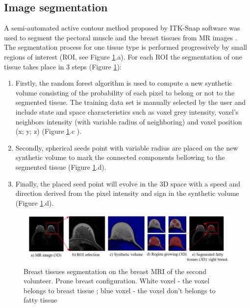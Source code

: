 \subsection{Image segmentation}%

A semi-automated active contour method proposed by ITK-Snap software was used to segment the pectoral muscle and the breast tissues from MR images \citep{yushkevich_user_2006}. The segmentation process for one tissue type is performed progressively by small regions of interest (ROI, see Figure \ref{fig:breasttissuessegmentation}.a). For each ROI the segmentation of one tissue takes place in 3 steps (Figure \ref{fig:breasttissuessegmentation}):
\begin{enumerate}
\item Firstly, the random forest algorithm \citep{ho_random_1995} is used to compute a new synthetic volume consisting of the probability of each pixel to belong or not to the segmented tissue. The training data set is manually selected by the user and include state and space characteristics such as voxel grey intensity, voxel's neighbors intensity (with variable radius of neighboring) and voxel position (x; y; z) (Figure \ref{fig:breasttissuessegmentation}.c ). 

\item Secondly, spherical seeds point with variable radius are placed on the new synthetic volume to mark the connected components bellowing to the segmented tissue (Figure \ref{fig:breasttissuessegmentation}.d).
\item Finally, the placed seed point will evolve in the 3D space with a speed and direction derived from the pixel intensity and sign in the synthetic volume (Figure \ref{fig:breasttissuessegmentation}.d).
\end{enumerate}

 
 \begin{figure}[H]
\centering
\includegraphics[width=1\textwidth,keepaspectratio]{figures/tissues_segmentation.png} 
\caption{Breast tissues segmentation on the breast MRI of the second volunteer. Prone breast configuration. White voxel - the voxel belongs to breast tissue ; blue voxel - the voxel don't belongs to fatty tissue} \label{fig:breasttissuessegmentation}
\end{figure}

